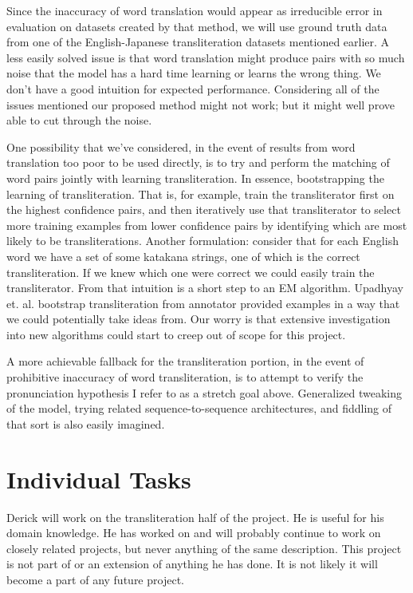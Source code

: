 \documentclass{article}
\begin{document}
Since the inaccuracy of word translation would appear as irreducible error
in evaluation on datasets created by that method,
we will use ground truth data
from one of the English-Japanese transliteration datasets mentioned earlier.
A less easily solved issue is that
word translation might produce pairs with so much noise
that the model has a hard time learning or learns the wrong thing.
We don't have a good intuition for expected performance.
Considering all of the issues mentioned our proposed method might not work;
but it might well prove able to cut through the noise.

One possibility that we've considered,
in the event of results from word translation too poor to be used directly,
is to try and perform the matching of word pairs
jointly with learning transliteration.
In essence, bootstrapping the learning of transliteration.
That is,
for example,
train the transliterator first on the highest confidence pairs,
and then iteratively use that transliterator
to select more training examples from lower confidence pairs
by identifying which are most likely to be transliterations.
Another formulation:
consider that for each English word
we have a set of some katakana strings,
one of which is the correct transliteration.
If we knew which one were correct we could easily train the transliterator.
From that intuition is a short step to an EM algorithm.
Upadhyay et. al. \cite{Upadhyay2018BootstrappingTW}
bootstrap transliteration from annotator provided examples
in a way that we could potentially take ideas from.
Our worry is that extensive investigation into new algorithms
could start to creep out of scope for this project.

A more achievable fallback for the transliteration portion,
in the event of prohibitive inaccuracy of word transliteration,
is to attempt to verify
the pronunciation hypothesis I refer to as a stretch goal above.
Generalized tweaking of the model,
trying related sequence-to-sequence architectures,
and fiddling of that sort is also easily imagined.

\section*{Individual Tasks}

Derick will work on the transliteration half of the project.
He is useful for his domain knowledge.
He has worked on and will probably continue to work on
closely related projects,
but never anything of the same description.
This project is not part of or an extension of anything he has done.
It is not likely it will become a part of any future project.

{}

\end{document}
